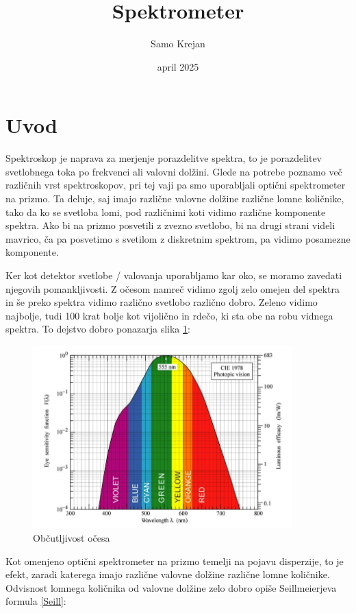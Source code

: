 \documentclass[12pt]{article}
\title{\textbf{Spektrometer}}
\author{Samo Krejan}
\date{april 2025}
\begin{document}
\maketitle

\section{Uvod}
Spektroskop je naprava za merjenje porazdelitve spektra, to je porazdelitev svetlobnega toka po frekvenci ali valovni dolžini. Glede na potrebe poznamo več različnih vrst spektroskopov, pri tej vaji pa smo uporabljali optični spektrometer na prizmo. Ta deluje, saj imajo različne valovne dolžine različne lomne količnike, tako da ko se svetloba lomi, pod različnimi koti vidimo različne komponente spektra. Ako bi na prizmo posvetili z zvezno svetlobo, bi na drugi strani videli mavrico, ča pa posvetimo s svetilom z diskretnim spektrom, pa vidimo posamezne komponente.

Ker kot detektor svetlobe / valovanja uporabljamo kar oko, se moramo zavedati njegovih pomankljivosti. Z očesom namreč vidimo zgolj zelo omejen del spektra in še preko spektra vidimo različno svetlobo različno dobro. Zeleno vidimo najbolje, tudi 100 krat bolje kot vijolično in rdečo, ki sta obe na robu vidnega spektra. To dejstvo dobro ponazarja slika \ref{oko}:

\begin{figure}[ht]
\begin{center}
    \includegraphics[width=10cm]{oko.png}
    \caption{Občutljivost očesa}
    \label{oko}
\end{center}
\end{figure}

Kot omenjeno optični spektrometer na prizmo temelji na pojavu disperzije, to je efekt, zaradi katerega imajo različne valovne dolžine različne lomne količnike. Odvisnost lomnega količnika od valovne dolžine zelo dobro opiše Seillmeierjeva formula \ref{Seill}:
\end{document}
